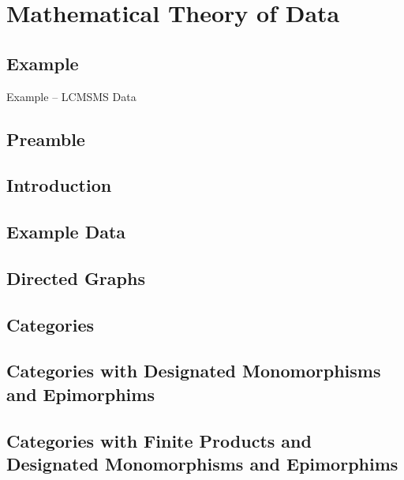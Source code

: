 \section{Mathematical Theory of Data}

\subsection{Example}
\begin{frame}{Example -- LCMSMS Data}
\scalebox{0.2}{

}
\end{frame}


\subsection{Preamble}


\subsection{Introduction}


\subsection{Example Data}


\subsection{Directed Graphs}



\subsection{Categories}



\subsection{Categories with Designated Monomorphisms and Epimorphims}


\subsection{Categories with Finite Products and Designated Monomorphisms and Epimorphims}


